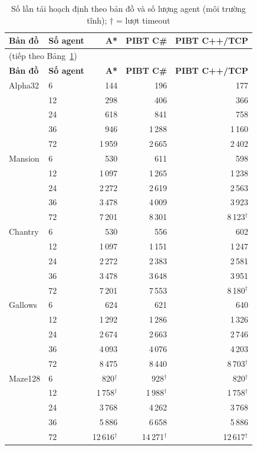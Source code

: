 \documentclass[../DoAn.tex]{subfiles}
\begin{document}
\begin{longtable}{|l|l|r|r|r|}
\caption{Số lần tái hoạch định theo bản đồ và số lượng agent (môi trường tĩnh); \(\dagger\) = lượt timeout}
\label{tab:scaling_detail} \\
\hline
\textbf{Bản đồ} & \textbf{Số agent} & \textbf{A*} & \textbf{PIBT C\#} & \textbf{PIBT C++/TCP} \\ \hline
\endfirsthead
\multicolumn{5}{|l|}{\small (tiếp theo Bảng~\ref{tab:scaling_detail})} \\ \hline
\textbf{Bản đồ} & \textbf{Số agent} & \textbf{A*} & \textbf{PIBT C\#} & \textbf{PIBT C++/TCP} \\ \hline
\endhead
Alpha32  &  6 & 144 & 196 & 177 \\
         & 12 & 298 & 406 & 366 \\
         & 24 & 618 & 841 & 758 \\
         & 36 & 946 & 1\,288 & 1\,160 \\
         & 72 & 1\,959 & 2\,665 & 2\,402 \\
\hline
Mansion  &  6 & 530 & 611 & 598 \\
         & 12 & 1\,097 & 1\,265 & 1\,238 \\
         & 24 & 2\,272 & 2\,619 & 2\,563 \\
         & 36 & 3\,478 & 4\,009 & 3\,923 \\
         & 72 & 7\,201 & 8\,301 & 8\,123$^\dagger$ \\
\hline
Chantry  &  6 & 530 & 556 & 602 \\
         & 12 & 1\,097 & 1\,151 & 1\,247 \\
         & 24 & 2\,272 & 2\,383 & 2\,581 \\
         & 36 & 3\,478 & 3\,648 & 3\,951 \\
         & 72 & 7\,201 & 7\,553 & 8\,180$^\dagger$ \\
\hline
Gallows  &  6 & 624 & 621 & 640 \\
         & 12 & 1\,292 & 1\,286 & 1\,326 \\
         & 24 & 2\,674 & 2\,663 & 2\,746 \\
         & 36 & 4\,093 & 4\,076 & 4\,203 \\
         & 72 & 8\,475 & 8\,440 & 8\,703$^\dagger$ \\
\hline
Maze128  &  6 & 820$^\dagger$ & 928$^\dagger$ & 820$^\dagger$ \\
         & 12 & 1\,758$^\dagger$ & 1\,988$^\dagger$ & 1\,758$^\dagger$ \\
         & 24 & 3\,768 & 4\,262 & 3\,768 \\
         & 36 & 5\,886 & 6\,658 & 5\,886 \\
         & 72 & 12\,616$^\dagger$ & 14\,271$^\dagger$ & 12\,617$^\dagger$ \\
\hline
\end{longtable}
\end{document}
